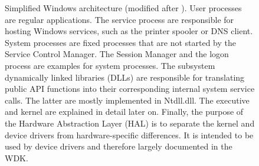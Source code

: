 \begin{figure}[htb!]
	\center
	\caption[
		Simplified Windows architecture
	]{
		Simplified Windows architecture (modified after \cite{Yosifovich2017}).
		User processes are regular applications. The service process are responsible for hosting Windows services, such as the printer spooler or DNS client. System processes are fixed processes that are not started by the Service Control Manager. The Session Manager and the logon process are examples for system processes.
		The subsystem dynamically linked libraries (DLLs) are responsible for translating public API functions into their corresponding internal system service calls. The latter are mostly implemented in Ntdll.dll.
		The executive and kernel are explained in detail later on. Finally, the purpose of the Hardware Abstraction Layer (HAL) is to separate the kernel and device drivers from hardware-specific differences. It is intended to be used by device drivers and therefore largely documented in the WDK.
	}
	\label{fig:background.kerneldriver.winarchitecture}
\end{figure}

